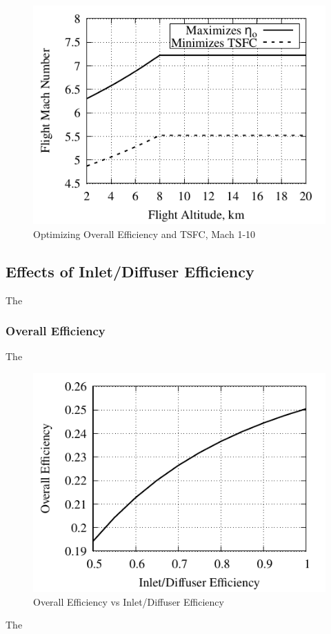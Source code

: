 \documentclass[conf]{new-aiaa} %
\begin{document}
\begin{figure}[H] %
    \centering
    \includegraphics[]{media/performance_parameter_files/part_e_range_1_10.pdf}
    \caption{\label{fig:parte1-10}Optimizing Overall Efficiency and TSFC, Mach 1-10}
\end{figure}

\subsection{Effects of Inlet/Diffuser Efficiency} %
The

\subsubsection{Overall Efficiency}
The

\begin{figure}[H] %
    \centering
    \includegraphics[]{media/performance_parameter_files/part_f_eta_o.pdf}
    \caption{\label{fig:partfetao}Overall Efficiency vs Inlet/Diffuser Efficiency}
\end{figure}
The
\end{document}
